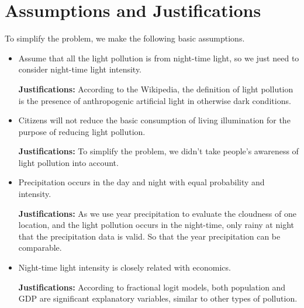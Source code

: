 \MinParskip{}
\section{Assumptions and Justifications} 
To simplify the problem, we make the following basic assumptions.

\begin{itemize}
    \item Assume that all the light pollution is from night-time light, so we just need to consider night-time light intensity.  

    \textbf{Justifications: }According to the Wikipedia\cite{wiki}, the definition of light pollution is the presence of anthropogenic artificial light in otherwise dark conditions. 

    \item Citizens will not reduce the basic consumption of living illumination for the purpose of reducing light pollution.
    
    \textbf{Justifications: }To simplify the problem, we didn't take people's awareness of light pollution into account.

    \item Precipitation occurs in the day and night with equal probability and intensity.
    
    \textbf{Justifications: }As we use year precipitation to evaluate the cloudness of one location, and the light pollution occurs in the night-time, only rainy at night that the precipitation data is valid. So that the year precipitation can be comparable.

    \item Night-time light intensity is closely related with economics.
    
    \textbf{Justifications: }According to fractional logit models\cite{GALLAWAY2010658}, both population and GDP are significant explanatory variables, similar to other types of pollution. 
\end{itemize}

